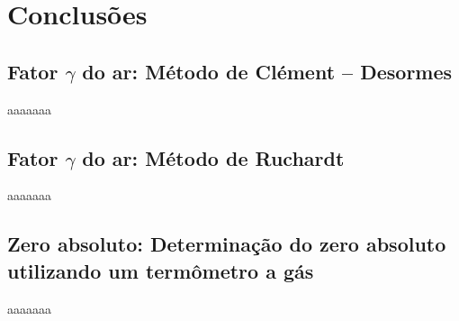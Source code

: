 \newpage
\section{Conclusões}

\subsection{Fator $\gamma$ do ar: Método de Clément – Desormes}

aaaaaaa

\subsection{Fator $\gamma$ do ar: Método de Ruchardt}

aaaaaaa

\subsection{Zero absoluto: Determinação do zero absoluto utilizando um termômetro a
gás}

aaaaaaa
